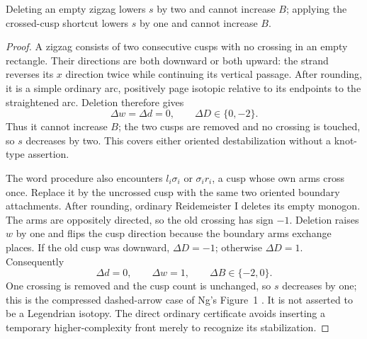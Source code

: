 \begin{lemma}
\label{ng:deletions}
Deleting an empty zigzag lowers $s$ by two and cannot increase $B$; applying
the crossed-cusp shortcut lowers $s$ by one and cannot increase $B$.
\end{lemma}
\begin{proof}
A zigzag consists of two consecutive cusps with no crossing in an empty
rectangle. Their directions are both downward or both upward: the
strand reverses its $x$ direction twice while continuing its vertical
passage. After rounding, it is a simple ordinary arc, positively page
isotopic relative to its endpoints to the straightened arc. Deletion
therefore gives
\begin{equation}\label{ng:zigzag-counts}
 \Delta w=\Delta d=0,\qquad \Delta D\in\{0,-2\}.
\end{equation}
Thus it cannot increase $B$; the two cusps are removed and no crossing is
touched, so $s$ decreases by two. This covers either oriented destabilization
without a knot-type assertion.

The word procedure also encounters $l_i\sigma_i$ or $\sigma_i r_i$,
a cusp whose own arms cross once. Replace it by the uncrossed cusp with
the same two oriented boundary attachments. After rounding, ordinary
Reidemeister I deletes its empty monogon. The arms are oppositely
directed, so the old crossing has sign $-1$. Deletion raises $w$ by one
and flips the cusp direction because the boundary arms exchange places.
If the old cusp was downward, $\Delta D=-1$; otherwise $\Delta D=1$.
Consequently
\begin{equation}\label{ng:crossed-cusp-counts}
 \Delta d=0,\qquad \Delta w=1,\qquad \Delta B\in\{-2,0\}.
\end{equation}
One crossing is removed and the cusp count is unchanged, so $s$ decreases
by one; this is the compressed dashed-arrow case of Ng's Figure~1
\cite{Ng}. It is not asserted to be a Legendrian isotopy. The direct
ordinary certificate avoids inserting a temporary higher-complexity
front merely to recognize its stabilization.
\end{proof}

